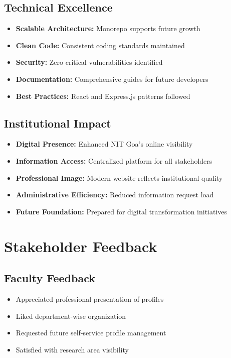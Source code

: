 \documentclass[12pt,a4paper]{report}
\begin{document}
\subsection{Technical Excellence}

\begin{itemize}
    \item \textbf{Scalable Architecture:} Monorepo supports future growth
    \item \textbf{Clean Code:} Consistent coding standards maintained
    \item \textbf{Security:} Zero critical vulnerabilities identified
    \item \textbf{Documentation:} Comprehensive guides for future developers
    \item \textbf{Best Practices:} React and Express.js patterns followed
\end{itemize}

\subsection{Institutional Impact}

\begin{itemize}
    \item \textbf{Digital Presence:} Enhanced NIT Goa's online visibility
    \item \textbf{Information Access:} Centralized platform for all stakeholders
    \item \textbf{Professional Image:} Modern website reflects institutional quality
    \item \textbf{Administrative Efficiency:} Reduced information request load
    \item \textbf{Future Foundation:} Prepared for digital transformation initiatives
\end{itemize}

\section{Stakeholder Feedback}

\subsection{Faculty Feedback}
\begin{itemize}
    \item Appreciated professional presentation of profiles
    \item Liked department-wise organization
    \item Requested future self-service profile management
    \item Satisfied with research area visibility
\end{itemize}
\end{document}
